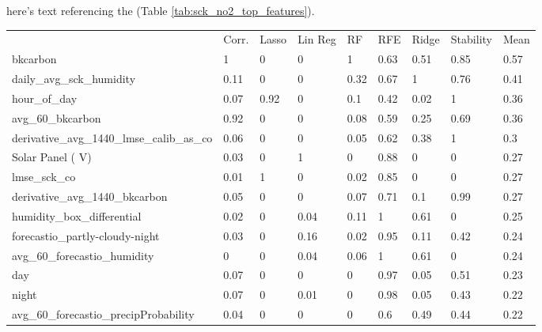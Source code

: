 here's text referencing the (Table \ref{tab:sck_no2_top_features}).

\begin{table}[H]
\centering
\begin{tabular}{lllllllll}
\\
\\
\toprule
     & Corr. & Lasso & Lin Reg & RF   & RFE  & Ridge & Stability & Mean \\
\midrule
bkcarbon                                   & 1     & 0          & 0    & 1    & 0.63  & 0.51      & 0.85 & 0.57 \\
daily\_avg\_sck\_humidity                  & 0.11  & 0          & 0    & 0.32 & 0.67  & 1         & 0.76 & 0.41 \\
hour\_of\_day                              & 0.07  & 0.92       & 0    & 0.1  & 0.42  & 0.02      & 1    & 0.36 \\
avg\_60\_bkcarbon                          & 0.92  & 0          & 0    & 0.08 & 0.59  & 0.25      & 0.69 & 0.36 \\
derivative\_avg\_1440\_lmse\_calib\_as\_co & 0.06  & 0          & 0    & 0.05 & 0.62  & 0.38      & 1    & 0.3  \\
Solar Panel ( V)                           & 0.03  & 0          & 1    & 0    & 0.88  & 0         & 0    & 0.27 \\
lmse\_sck\_co                              & 0.01  & 1          & 0    & 0.02 & 0.85  & 0         & 0    & 0.27 \\
derivative\_avg\_1440\_bkcarbon            & 0.05  & 0          & 0    & 0.07 & 0.71  & 0.1       & 0.99 & 0.27 \\
humidity\_box\_differential                & 0.02  & 0          & 0.04 & 0.11 & 1     & 0.61      & 0    & 0.25 \\
forecastio\_partly-cloudy-night            & 0.03  & 0          & 0.16 & 0.02 & 0.95  & 0.11      & 0.42 & 0.24 \\
avg\_60\_forecastio\_humidity              & 0     & 0          & 0.04 & 0.06 & 1     & 0.61      & 0    & 0.24 \\
day                                        & 0.07  & 0          & 0    & 0    & 0.97  & 0.05      & 0.51 & 0.23 \\
night                                      & 0.07  & 0          & 0.01 & 0    & 0.98  & 0.05      & 0.43 & 0.22 \\
avg\_60\_forecastio\_precipProbability     & 0.04  & 0          & 0    & 0    & 0.6   & 0.49      & 0.44 & 0.22 \\

\end{tabular}
\end{table}
